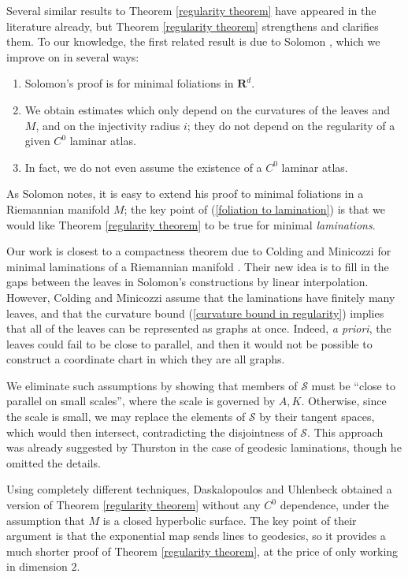 \documentclass[reqno,11pt]{amsart}
\newcommand{\RR}{\mathbf{R}}
\theoremstyle{definition}
\numberwithin{equation}{section}
\begin{document}
Several similar results to Theorem \ref{regularity theorem} have appeared in the literature already, but Theorem \ref{regularity theorem} strengthens and clarifies them.
To our knowledge, the first related result is due to Solomon \cite[Theorem 1.1]{Solomon86}, which we improve on in several ways:
\begin{enumerate}
\item \label{foliation to lamination} Solomon's proof is for minimal foliations in $\RR^d$.
\item We obtain estimates which only depend on the curvatures of the leaves and $M$, and on the injectivity radius $i$; they do not depend on the regularity of a given $C^0$ laminar atlas.
\item In fact, we do not even assume the existence of a $C^0$ laminar atlas.
\end{enumerate}
As Solomon notes, it is easy to extend his proof to minimal foliations in a Riemannian manifold $M$; the key point of (\ref{foliation to lamination}) is that we would like Theorem \ref{regularity theorem} to be true for minimal \emph{laminations}.

Our work is closest to a compactness theorem due to Colding and Minicozzi for minimal laminations of a Riemannian manifold \cite[Appendix B]{ColdingMinicozziIV}.
Their new idea is to fill in the gaps between the leaves in Solomon's constructions by linear interpolation.
However, Colding and Minicozzi assume that the laminations have finitely many leaves, and that the curvature bound (\ref{curvature bound in regularity}) implies that all of the leaves can be represented as graphs at once.
Indeed, \emph {a priori}, the leaves could fail to be close to parallel, and then it would not be possible to construct a coordinate chart in which they are all graphs.

We eliminate such assumptions by showing that members of $\mathcal S$ must be ``close to parallel on small scales'', where the scale is governed by $A, K$.
Otherwise, since the scale is small, we may replace the elements of $\mathcal S$ by their tangent spaces, which would then intersect, contradicting the disjointness of $\mathcal S$.
This approach was already suggested by Thurston \cite[\S8.5]{thurston1979geometry} in the case of geodesic laminations, though he omitted the details. 

Using completely different techniques, Daskalopoulos and Uhlenbeck \cite[Proposition 7.3]{daskalopoulos2020transverse} obtained a version of Theorem \ref{regularity theorem} without any $C^0$ dependence, under the assumption that $M$ is a closed hyperbolic surface.
The key point of their argument is that the exponential map sends lines to geodesics, so it provides a much shorter proof of Theorem \ref{regularity theorem}, at the price of only working in dimension $2$.
\end{document}
